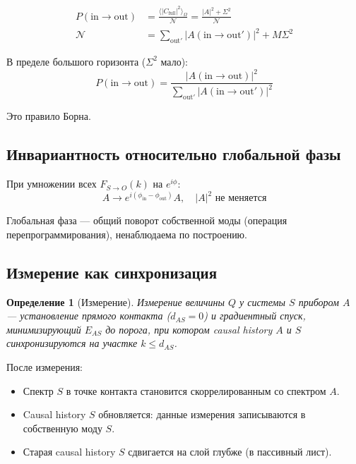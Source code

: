\documentclass[11pt,a4paper]{article}
\newtheorem{definition}{Определение}[section]
\theoremstyle{definition}
\begin{document}
\begin{align}
    P(\text{in} \to \text{out}) &= \frac{\langle |C_{\text{full}}|^2 \rangle_\Omega}{\mathcal{N}} = \frac{|A|^2 + \Sigma^2}{\mathcal{N}} \\
    \mathcal{N} &= \sum_{\text{out}'} |A(\text{in} \to \text{out}')|^2 + M\Sigma^2
\end{align}

В пределе большого горизонта ($\Sigma^2$ мало):
\begin{equation}
    \boxed{P(\text{in} \to \text{out}) = \frac{|A(\text{in} \to \text{out})|^2}{\sum_{\text{out}'} |A(\text{in} \to \text{out}')|^2}}
\end{equation}

Это правило Борна.

\subsection{Инвариантность относительно глобальной фазы}

При умножении всех $F_{S \to O}(k)$ на $e^{i\phi}$:
\begin{equation}
    A \to e^{i(\phi_{\text{in}} - \phi_{\text{out}})} A, \quad |A|^2 \text{ не меняется}
\end{equation}

Глобальная фаза --- общий поворот собственной моды (операция перепрограммирования), ненаблюдаема по построению.

\subsection{Измерение как синхронизация}

\begin{definition}[Измерение]
Измерение величины $Q$ у системы $S$ прибором $A$ --- установление прямого контакта ($d_{AS} = 0$) и градиентный спуск, минимизирующий $E_{AS}$ до порога, при котором causal history $A$ и $S$ синхронизируются на участке $k \leq d_{AS}$.
\end{definition}

После измерения:
\begin{itemize}
    \item Спектр $S$ в точке контакта становится скоррелированным со спектром $A$.
    \item Causal history $S$ обновляется: данные измерения записываются в собственную моду $S$.
    \item Старая causal history $S$ сдвигается на слой глубже (в пассивный лист).
\end{itemize}
\end{document}
